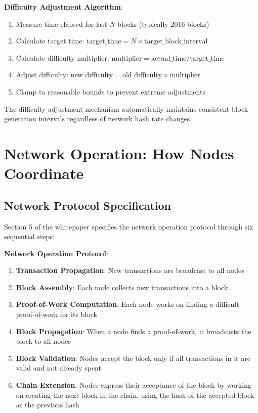 \textbf{Difficulty Adjustment Algorithm}:
\begin{enumerate}
  \item Measure time elapsed for last $N$ blocks (typically 2016 blocks)
  \item Calculate target time: $\text{target\_time} = N \times \text{target\_block\_interval}$
  \item Calculate difficulty multiplier: $\text{multiplier} = \text{actual\_time} / \text{target\_time}$
  \item Adjust difficulty: $\text{new\_difficulty} = \text{old\_difficulty} \times \text{multiplier}$
  \item Clamp to reasonable bounds to prevent extreme adjustments
\end{enumerate}

The difficulty adjustment mechanism automatically maintains consistent block generation intervals regardless of network hash rate changes.


\section{Network Operation: How Nodes Coordinate}
\label{sec:network-operation}

\subsection{Network Protocol Specification}
\label{subsec:ch03-network-protocol}

Section 5 of the whitepaper specifies the network operation protocol through six sequential steps:

\textbf{Network Operation Protocol}:
\begin{enumerate}
  \item \textbf{Transaction Propagation}: New transactions are broadcast to all nodes
  \item \textbf{Block Assembly}: Each node collects new transactions into a block
  \item \textbf{Proof-of-Work Computation}: Each node works on finding a difficult proof-of-work for its block
  \item \textbf{Block Propagation}: When a node finds a proof-of-work, it broadcasts the block to all nodes
  \item \textbf{Block Validation}: Nodes accept the block only if all transactions in it are valid and not already spent
  \item \textbf{Chain Extension}: Nodes express their acceptance of the block by working on creating the next block in the chain, using the hash of the accepted block as the previous hash
\end{enumerate}

